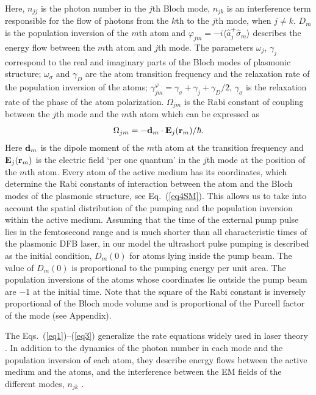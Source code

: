 \documentclass[aps,pra,amsmath,amssymb,onecolumn,superscriptaddress,showpacs,floatfix,]{revtex4-1}
\begin{document}
Here, $n_{jj}$ is the photon number in the $j$th Bloch mode, $n_{jk}$ is an interference term responsible for the flow of photons from the $k$th to the $j$th mode, when $j \neq k$.
$D_m$ is the population inversion of the $m$th atom and $\varphi _{jm} = - i \langle \hat{a} _j^{+} \hat{\sigma} _m \rangle$ describes the energy flow between the $m$th atom and $j$th mode.
The parameters $\omega _j$, $\gamma _j$ correspond to the real and imaginary parts of the Bloch modes of plasmonic structure; $\omega _{\sigma}$ and $\gamma _D$ are the atom transition frequency and the relaxation rate of the population inversion of the atoms; $\gamma _{jm}^{\varphi} = \gamma _{\sigma} + \gamma _j + \gamma _D / 2$, $\gamma _{\sigma}$ is the relaxation rate of the phase of the atom polarization.
$\Omega _{jm}$ is the Rabi constant of coupling between the $j$th mode and the $m$th atom which can be expressed as
\begin{equation}\label{eq4SM}
{\Omega _{jm}} =  - {{\bf{d}}_m} \cdot {{\bf{E}}_j}({{\bf{r}}_m})/ \hbar.
\end{equation}
Here ${{\bf{d}}_m}$  is the dipole moment of the $m$th atom at the transition frequency and ${{\bf{E}}_j}({{\bf{r}}_m})$  is the electric field `per one quantum' in the $j$th mode at the position of the $m$th atom. Every atom of the active medium has its coordinates, which determine the Rabi constants of interaction between the atom and the Bloch modes of the plasmonic structure, see Eq.~(\ref{eq4SM}). This allows us to take into account the spatial distribution of the pumping and the population inversion within the active medium. Assuming that the time of the external pump pulse lies in the femtosecond range and is much shorter than all characteristic times of the plasmonic DFB laser, in our model the ultrashort pulse pumping is described as the initial condition, $D_m(0)$ for atoms lying inside the pump beam. The value of $D_m(0)$ is proportional to the pumping energy per unit area. The population inversions of the atoms whose coordinates lie outside the pump beam are $-1$ at the initial time. Note that the square of the Rabi constant is inversely proportional of the Bloch mode volume and is proportional of the Purcell factor of the mode (see Appendix).

The Eqs.~(\ref{eq1})--(\ref{eq3}) generalize the rate equations widely used in laser theory \cite{SiegmanLasers}.
In addition to the dynamics of the photon number in each mode and the population inversion of each atom, they describe energy flows between the active medium and the atoms, and the interference between the EM fields of the different modes, $n_{jk}$ \cite{Zyablovsky2017approach}. 
\end{document}
